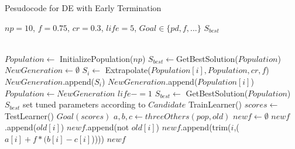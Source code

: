 
\begin{algorithm}[!t]
\caption{Pesudocode for DE with Early Termination}
\label{alg:DE}
\scriptsize
\begin{algorithmic}[1]
\Require $\mathit{np} = 10$, $f=0.75$, $cr=0.3$, $\mathit{life} = 5$, $\mathit{Goal} \in \{\mathit{pd},f,...\}$
\Ensure $S_{best}$

~\\
     
 \State $Population  \gets $ InitializePopulation($\mathit{np}$)   
 \State $S_{best} \gets $GetBestSolution($Population $)
\State $NewGeneration \gets \emptyset$
\State $S_i \gets$ Extrapolate($Population [i], Population , cr, f$)
\State $NewGeneration$.append($S_i$)
\Else
\State $NewGeneration$.append($Population [i]$)
\EndIf
\EndFor
\State $Population  \gets NewGeneration$
\State $life -=1$
\EndIf
\State $S_{best} \gets$ GetBestSolution($Population $)
 \EndWhile
\State \Return $S_{best}$
\EndFunction
{}
   \State set tuned parameters according to $Candidate$
   \State TrainLearner()
   \State $scores \gets$TestLearner()   
   \State \Return$\mathit{Goal}(scores)$  
\EndFunction
{}
  \State $a, b, c\gets threeOthers(pop,old)$  
  \State $newf \gets \emptyset$
         \State $newf$.append($old[i]$)
                \Else
                    \State $newf$.append(not $old[i]$)
         \Else
          \State $newf$.append(trim($i$,($a[i] + f * (b[i] - c[i]$)))) 
         \EndIf
       \EndIf
  \EndFor
 \State \Return $newf$
\EndFunction
        \end{algorithmic}            
\end{algorithm}
